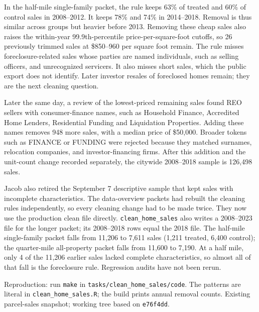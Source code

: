 In the half-mile single-family packet, the rule keeps 63\% of treated and 60\%
of control sales in 2008--2012. It keeps 78\% and 74\% in 2014--2018. Removal
is thus similar across groups but heavier before 2013. Removing these cheap
sales also raises the within-year 99.9th-percentile price-per-square-foot
cutoffs, so 26 previously trimmed sales at \$850--960 per square foot remain. The rule misses
foreclosure-related sales whose parties are named individuals, such as
selling officers, and unrecognized servicers. It also misses short sales,
which the public export does not identify. Later investor resales of
foreclosed homes remain; they are the next cleaning question.

Later the same day, a review of the lowest-priced remaining sales found REO
sellers with consumer-finance names, such as Household Finance, Accredited
Home Lenders, Residential Funding and Liquidation Properties. Adding these
names removes 948 more sales, with a median price of \$50,000. Broader tokens
such as FINANCE or FUNDING were rejected because they matched surnames,
relocation companies, and investor-financing firms. After this addition and
the unit-count change recorded separately, the citywide 2008--2018 sample is
126,498 sales.

Jacob also retired the September 7 descriptive sample that kept sales with
incomplete characteristics. The data-overview packets had rebuilt the cleaning
rules independently, so every cleaning change had to be made twice. They now
use the production clean file directly. \texttt{clean\_home\_sales} also writes a
2008--2023 file for the longer packet; its 2008--2018 rows equal the 2018 file.
The half-mile single-family packet falls from 11,206 to 7,611 sales (1,211
treated, 6,400 control); the quarter-mile all-property packet falls from
11,600 to 7,190. At a half mile, only 4 of the 11,206 earlier sales lacked
complete characteristics, so almost all of that fall is the foreclosure rule.
Regression audits have not been rerun.

\small
Reproduction: run \texttt{make} in \texttt{tasks/clean\_home\_sales/code}.
The patterns are literal in \texttt{clean\_home\_sales.R}; the build prints
annual removal counts. Existing parcel-sales snapshot; working tree based on
\texttt{e76f4dd}.
\normalsize
